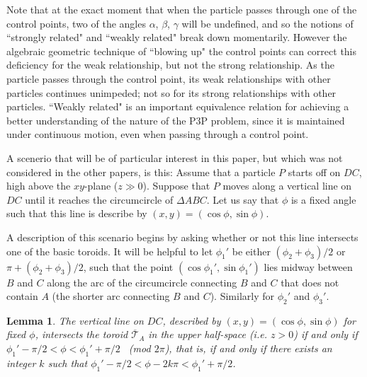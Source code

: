 \documentclass[a4paper, twoside]{article}
\newtheorem{lemma}{Lemma}
\begin{document}
Note that at the exact moment that when the particle passes through one of the control points, two of the angles $\alpha$, $\beta$, $\gamma$ will be undefined, and so the notions of ``strongly related" and ``weakly related" break down momentarily. However the algebraic geometric technique of ``blowing up" the control points can correct this deficiency for the weak relationship, but not the strong relationship. As the particle passes through the control point, its weak relationships with other particles continues unimpeded; not so for its strong relationships with other particles. ``Weakly related" is an important equivalence relation for achieving a better understanding of the nature of the P3P problem, since it is maintained under continuous motion, even when passing through a control point.

A scenerio that will be of particular interest in this paper, but which was not considered in the other papers, is this: Assume that a particle $P$ starts off on $DC$, high above the $xy$-plane ($z \gg 0$). Suppose that $P$ moves along a vertical line on $DC$ until it reaches the circumcircle of $\Delta ABC$. Let us say that $\phi$ is a fixed angle such that this line is describe by $(x, y) = (\cos\phi, \sin\phi)$. 

A description of this scenario begins by asking whether or not this line intersects one of the basic toroids. It will be helpful to let $\phi_1'$ be either $(\phi_2 + \phi_3)/2$ or $\pi + (\phi_2 + \phi_3)/2$, such that the point $(\cos \phi_1', \sin \phi_1')$ lies midway between $B$ and $C$ along the arc of the circumcircle connecting $B$ and $C$ that does not contain $A$ (the shorter arc connecting $B$ and $C$). Similarly for $\phi_2'$ and $\phi_3'$. 

\vspace{2mm}

\begin{lemma}
 
The vertical line on $DC$, described by $(x, y) = (\cos\phi, \sin\phi)$ for fixed $\phi$, intersects the toroid $\overline{\mathcal{T}}_A$ in the upper half-space ({\it i.e.} $z > 0$) if and only if $\phi_1' - \pi/2 < \phi < \phi_1' + \pi/2$ \ (mod $2\pi$), that is, if and only if there exists an integer $k$ such that $\phi_1' - \pi/2 < \phi - 2k\pi < \phi_1' + \pi/2$.

\end{lemma}
\end{document}
